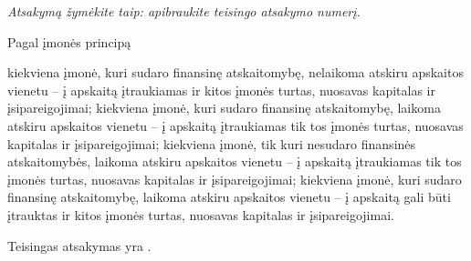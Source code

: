 \begin{tasks}

  \emph{Atsakymą žymėkite taip: apibraukite teisingo atsakymo numerį.}

  \begin{task}
    \begin{condition}
      Pagal įmonės principą
      \begin{enumerate}
         kiekviena įmonė, kuri sudaro finansinę atskaitomybę,
          nelaikoma atskiru apskaitos vienetu – į apskaitą įtraukiamas
          ir kitos įmonės turtas, nuosavas kapitalas ir įsipareigojimai;
         kiekviena įmonė, kuri sudaro finansinę atskaitomybę,
          laikoma atskiru apskaitos vienetu – į apskaitą įtraukiamas tik
          tos įmonės turtas, nuosavas kapitalas ir įsipareigojimai;
         kiekviena įmonė, tik kuri nesudaro finansinės
          atskaitomybės, laikoma atskiru apskaitos vienetu – į apskaitą
          įtraukiamas tik tos įmonės turtas, nuosavas kapitalas ir
          įsipareigojimai;
         kiekviena įmonė, kuri sudaro finansinę atskaitomybę,
          laikoma atskiru apskaitos vienetu – į apskaitą gali būti
          įtrauktas ir kitos įmonės turtas, nuosavas kapitalas ir
          įsipareigojimai.
      \end{enumerate}
    \end{condition}
    \begin{solution}
      Teisingas atsakymas yra .
    \end{solution}
  \end{task}


\end{tasks}
